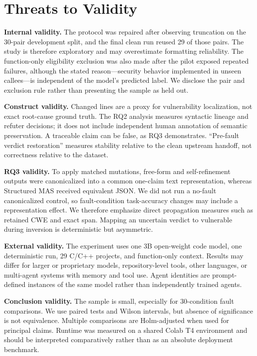 \section{Threats to Validity}
\label{sec:threats}

\textbf{Internal validity.} The protocol was repaired after observing truncation on the 30-pair development split, and the final clean run reused 29 of those pairs. The study is therefore exploratory and may overestimate formatting reliability. The function-only eligibility exclusion was also made after the pilot exposed repeated failures, although the stated reason---security behavior implemented in unseen callees---is independent of the model's predicted label. We disclose the pair and exclusion rule rather than presenting the sample as held out.

\textbf{Construct validity.} Changed lines are a proxy for vulnerability localization, not exact root-cause ground truth. The RQ2 analysis measures syntactic lineage and refuter decisions; it does not include independent human annotation of semantic preservation. A traceable claim can be false, as RQ3 demonstrates. ``Pre-fault verdict restoration'' measures stability relative to the clean upstream handoff, not correctness relative to the dataset.

\textbf{RQ3 validity.} To apply matched mutations, free-form and self-refinement outputs were canonicalized into a common one-claim text representation, whereas Structured MAS received equivalent JSON. We did not run a no-fault canonicalized control, so fault-condition task-accuracy changes may include a representation effect. We therefore emphasize direct propagation measures such as retained CWE and exact span. Mapping an uncertain verdict to vulnerable during inversion is deterministic but asymmetric.

\textbf{External validity.} The experiment uses one 3B open-weight code model, one deterministic run, 29 C/C++ projects, and function-only context. Results may differ for larger or proprietary models, repository-level tools, other languages, or multi-agent systems with memory and tool use. Agent identities are prompt-defined instances of the same model rather than independently trained agents.

\textbf{Conclusion validity.} The sample is small, especially for 30-condition fault comparisons. We use paired tests and Wilson intervals, but absence of significance is not equivalence. Multiple comparisons are Holm-adjusted when used for principal claims. Runtime was measured on a shared Colab T4 environment and should be interpreted comparatively rather than as an absolute deployment benchmark.
